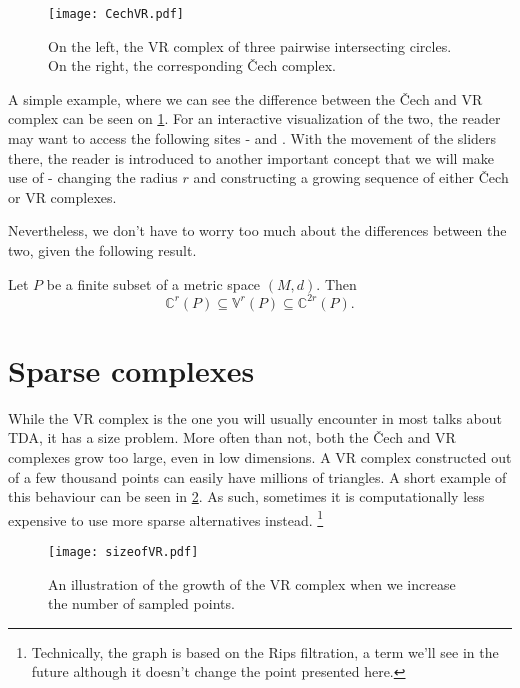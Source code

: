 \begin{figure}[h!]
  \centering
  \texttt{[image: CechVR.pdf]}
  \caption{On the left, the VR complex of three pairwise intersecting circles. On the right, the corresponding Čech complex.}
  \label{fig:CechVR}
\end{figure}

A simple example, where we can see the difference between the Čech and VR complex can be seen on \ref{fig:CechVR}. For an interactive visualization of the two, the reader may want to access the following sites - \cite{smajhiVietorisx2013RipsComplex} and \cite{saulnechComplex}. With the movement of the sliders there, the reader is introduced to another important concept that we will make use of - changing the radius $r$ and constructing a growing sequence of either Čech or VR complexes.

Nevertheless, we don't have to worry too much about the differences between the two, given the following result.

\begin{theorem}
  Let $P$ be a finite subset of a metric space $(M,d)$. Then
  \begin{equation}
    \mathbb{C}^{r}(P) \subseteq \mathbb{V}^{r}(P) \subseteq \mathbb{C}^{2r}(P).
  \end{equation}
\end{theorem}

\section{Sparse complexes}

While the VR complex is the one you will usually encounter in most talks about TDA, it has a size problem. More often than not, both the Čech and VR complexes grow too large, even in low dimensions. A VR complex constructed out of a few thousand points can easily have millions of triangles. A short example of this behaviour can be seen in \ref{fig:sizeofVR}. As such, sometimes it is computationally less expensive to use more sparse alternatives instead. \footnote{Technically, the graph is based on the Rips filtration, a term we'll see in the future although it doesn't change the point presented here.}

\begin{figure}[h!]
  \centering
  \texttt{[image: sizeofVR.pdf]}
  \caption{An illustration of the growth of the VR complex when we increase the number of sampled points.}
  \label{fig:sizeofVR}
\end{figure}

